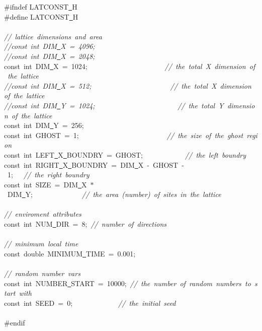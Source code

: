 {\ttfamily \raggedright \small
\#ifndef LATCONST\underline\ H\\
\#define LATCONST\underline\ H\\
\ \\
\textsl{//\ lattice\ dimensions\ and\ area}\\
\textsl{//const\ int\ DIM\underline\ X\ =\ 4096;}\\
\textsl{//const\ int\ DIM\underline\ X\ =\ 2048;}\\
const\ int\ DIM\underline\ X\ =\ 1024;\ \ \ \ \ \ \ \ \ \ \ \ \ \ \ \ \ \ \ \ \ \ \textsl{//\ the\ total\ X\ dimension\ of\ the\ lattice}\\
\textsl{//const\ int\ DIM\underline\ X\ =\ 512;\ \ \ \ \ \ \ \ \ \ \ \ \ \ \ \ \ \ \ \ \ \ //\ the\ total\ X\ dimension\ of\ the\ lattice}\\
\textsl{//const\ int\ DIM\underline\ Y\ =\ 1024;\ \ \ \ \ \ \ \ \ \ \ \ \ \ \ \ \ \ \ \ \ \ \ //\ the\ total\ Y\ dimension\ of\ the\ lattice}\\
const\ int\ DIM\underline\ Y\ =\ 256;\\
const\ int\ GHOST\ =\ 1;\ \ \ \ \ \ \ \ \ \ \ \ \ \ \ \ \ \ \ \ \ \ \ \ \ \textsl{//\ the\ size\ of\ the\ ghost\ region}\\
const\ int\ LEFT\underline\ X\underline\ BOUNDRY\ =\ GHOST;\ \ \ \ \ \ \ \ \ \ \ \ \textsl{//\ the\ left\ boundry}\\
const\ int\ RIGHT\underline\ X\underline\ BOUNDRY\ =\ DIM\underline\ X\ -{}\ GHOST\ -{}\ 1;\ \ \ \textsl{//\ the\ right\ boundry}\\
const\ int\ SIZE\ =\ DIM\underline\ X\ $\ast$\ DIM\underline\ Y;\ \ \ \ \ \ \ \ \ \ \ \ \ \ \textsl{//\ the\ area\ (number)\ of\ sites\ in\ the\ lattice}\\
\ \\
\textsl{//\ enviroment\ attributes}\\
const\ int\ NUM\underline\ DIR\ =\ 8;\ \textsl{//\ number\ of\ directions}\\
\ \\
\textsl{//\ minimum\ local\ time}\\
const\ double\ MINIMUM\underline\ TIME\ =\ 0.001;\\
\ \\
\textsl{//\ random\ number\ vars}\\
const\ int\ NUMBER\underline\ START\ =\ 10000;\ \textsl{//\ the\ number\ of\ random\ numbers\ to\ start\ with}\\
const\ int\ SEED\ =\ 0;\ \ \ \ \ \ \ \ \ \ \ \ \ \textsl{//\ the\ initial\ seed}\\
\ \\
\#endif\\
\ \\
\ \\
 }
\normalfont\normalsize

